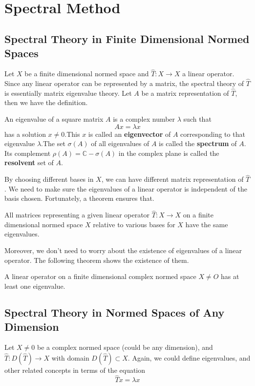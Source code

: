 \chapter{Spectral Method} \label{chap:spectral_method}
\section{Spectral Theory in Finite Dimensional Normed Spaces}
Let $X$ be a finite dimensional normed space and $\hat{T}: X \to X$ a linear operator. Since any linear operator can be represented by a matrix, the spectral theory of $\hat{T}$ is essentially matrix eigenvalue theory. \cite{kreyszig_introductory_1978} Let $A$ be a matrix representation of $\hat{T}$, then we have the definition.

\begin{definition}
	An eigenvalue of a square matrix $A$ is a complex number $\lambda$ such that
	\[ Ax = \lambda x \]
	has a solution $x\neq 0$.This $x$ is called an \textbf{eigenvector} of $A$ corresponding to that eigenvalue $\lambda$.The set $\sigma(A)$ of all eigenvalues of $A$ is called the \textbf{spectrum} of $A$. Its complement $\rho(A) = \mathbb{C}-\sigma(A)$ in the complex plane is called the \textbf{resolvent} set of $A$.
\end{definition}

By choosing different bases in $X$, we can have different matrix representation of $\hat{T}$. We need to make sure the eigenvalues of a linear operator is independent of the basis chosen. Fortunately, a theorem ensures that.

\begin{theorem}
	All matrices representing a given linear operator $\hat{T}: X \to X$ on a finite dimensional normed space $X$ relative to various bases for $X$ have the same eigenvalues.
\end{theorem}


Moreover, we don't need to worry about the existence of eigenvalues of a linear operator. The following theorem shows the existence of them.
\begin{theorem}
	A linear operator on a finite dimensional complex normed space $X\neq{O}$ has at least one eigenvalue.
\end{theorem}


\section{Spectral Theory in Normed Spaces of Any Dimension}
Let $X\neq {0}$ be a complex normed space (could be any dimension), and $\hat{T}: D(\hat{T}) \to X$ with domain $D(\hat{T}) \subset X$. Again, we could define eigenvalues, and other related concepts in terms of the equation
\[ \hat{T}x = \lambda x \]

